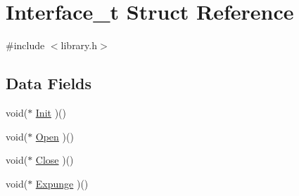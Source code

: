 \hypertarget{structInterface__t}{\section{Interface\+\_\+t Struct Reference}
\label{structInterface__t}
}


{\ttfamily \#include $<$library.\+h$>$}

\subsection*{Data Fields}
\begin{DoxyCompactItemize}
\item 
void($\ast$ \hyperlink{structInterface__t_a4ee594e6621396d6d813e11112421db2}{Init} )()
\item 
void($\ast$ \hyperlink{structInterface__t_a736388d3db04a7855355bbf59cdf2a02}{Open} )()
\item 
void($\ast$ \hyperlink{structInterface__t_a289af6f33158db4ca73a76c146ce045d}{Close} )()
\item 
void($\ast$ \hyperlink{structInterface__t_a35ed82ac93a8526acde92993fff28871}{Expunge} )()
\end{DoxyCompactItemize}



